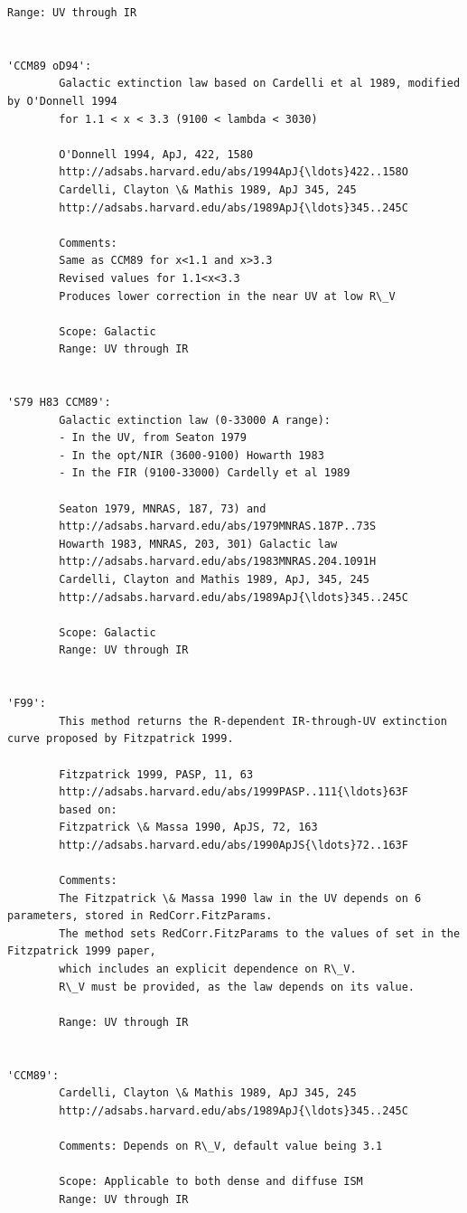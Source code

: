 \documentclass{report}
\begin{document}
\begin{Verbatim}[commandchars=\\\{\}]
        Range: UV through IR
        
        
'CCM89 oD94': 
        Galactic extinction law based on Cardelli et al 1989, modified by O'Donnell 1994
        for 1.1 < x < 3.3 (9100 < lambda < 3030)
        
        O'Donnell 1994, ApJ, 422, 1580
        http://adsabs.harvard.edu/abs/1994ApJ{\ldots}422..158O
        Cardelli, Clayton \& Mathis 1989, ApJ 345, 245
        http://adsabs.harvard.edu/abs/1989ApJ{\ldots}345..245C

        Comments:
        Same as CCM89 for x<1.1 and x>3.3
        Revised values for 1.1<x<3.3
        Produces lower correction in the near UV at low R\_V
        
        Scope: Galactic
        Range: UV through IR
        
        
'S79 H83 CCM89': 
        Galactic extinction law (0-33000 A range):
        - In the UV, from Seaton 1979
        - In the opt/NIR (3600-9100) Howarth 1983
        - In the FIR (9100-33000) Cardelly et al 1989
        
        Seaton 1979, MNRAS, 187, 73) and 
        http://adsabs.harvard.edu/abs/1979MNRAS.187P..73S
        Howarth 1983, MNRAS, 203, 301) Galactic law
        http://adsabs.harvard.edu/abs/1983MNRAS.204.1091H
        Cardelli, Clayton and Mathis 1989, ApJ, 345, 245
        http://adsabs.harvard.edu/abs/1989ApJ{\ldots}345..245C
        
        Scope: Galactic
        Range: UV through IR
        
        
'F99': 
        This method returns the R-dependent IR-through-UV extinction curve proposed by Fitzpatrick 1999.

        Fitzpatrick 1999, PASP, 11, 63
        http://adsabs.harvard.edu/abs/1999PASP..111{\ldots}63F
        based on: 
        Fitzpatrick \& Massa 1990, ApJS, 72, 163
        http://adsabs.harvard.edu/abs/1990ApJS{\ldots}72..163F
        
        Comments:
        The Fitzpatrick \& Massa 1990 law in the UV depends on 6 parameters, stored in RedCorr.FitzParams.
        The method sets RedCorr.FitzParams to the values of set in the Fitzpatrick 1999 paper, 
        which includes an explicit dependence on R\_V.
        R\_V must be provided, as the law depends on its value.
        
        Range: UV through IR

        
'CCM89': 
        Cardelli, Clayton \& Mathis 1989, ApJ 345, 245
        http://adsabs.harvard.edu/abs/1989ApJ{\ldots}345..245C

        Comments: Depends on R\_V, default value being 3.1

        Scope: Applicable to both dense and diffuse ISM
        Range: UV through IR
        
        

    \end{Verbatim}
\end{document}
